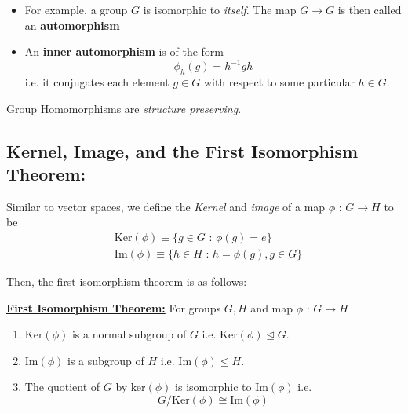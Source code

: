 \documentclass[11pt]{article}
\begin{document}
\vskip 0.5cm
\begin{dottedbox}
\begin{itemize}
  \item   For example, a group $G$ is isomorphic to \emph{itself}. The map $G \rightarrow G$ is then called an \textbf{ automorphism} 
  
  \item An \textbf{inner automorphism} is of the form 
  \[ \phi_h(g) = h^{-1}gh \]
  i.e. it conjugates each element $g \in G$ with respect to some particular $h \in G$.
\end{itemize}
\end{dottedbox}

\vskip 0.5cm
Group Homomorphisms are \emph{structure preserving}.


\vskip 1cm
\subsection{Kernel, Image, and the First Isomorphism Theorem:}

Similar to vector spaces, we define the \emph{Kernel} and \emph{image} of a map $\phi \text{ : } G \rightarrow H$ to be 
\begin{align*}
  &\text{Ker}(\phi) \equiv \{ g \in G \text{ : } \phi(g) = e \} \\
  &\text{Im}(\phi) \equiv \{ h \in H \text{ : } h = \phi(g), g \in G \} 
\end{align*}

Then, the first isomorphism theorem is as follows:

\vskip 0.5cm
\begin{dottedbox}
  \underline{\textbf{First Isomorphism Theorem:}} For groups $G, H$ and map $\phi \text{ : } G \rightarrow H$
  \begin{enumerate}[label=(\alph*)]
    \item Ker$(\phi)$ is a normal subgroup of $G$ i.e. Ker$(\phi) \trianglelefteq G$.
    \item Im$(\phi)$ is a subgroup of $H$ i.e. Im$(\phi) \leq H$.
    \item The quotient of $G$ by ker$(\phi)$ is isomorphic to Im$(\phi)$ i.e.
    \[ G / \text{Ker}(\phi) \cong \text{Im}(\phi) \]
  \end{enumerate}
\end{dottedbox}


\end{document}
